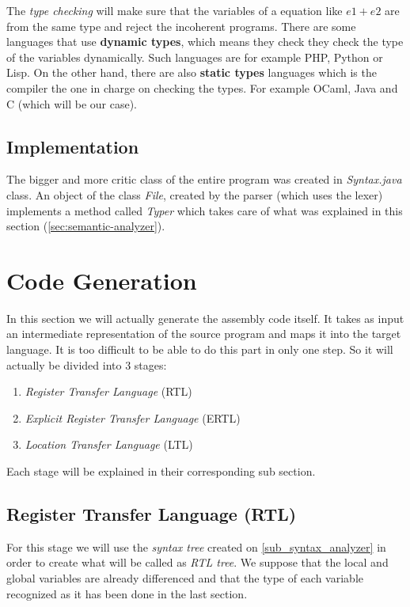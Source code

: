 \documentclass[conference]{IEEEtran}
\begin{document}
The \textit{type checking} will make sure that the variables of a equation like \(e1 + e2\) are from the same type and reject the incoherent programs. 
There are some languages that use \textbf{dynamic types}, which means they check they check the type of the variables dynamically. Such languages are for example PHP, Python or Lisp. On the other hand, there are also \textbf{static types} languages which is the compiler the one in charge on checking the types. For example OCaml, Java and C (which will be our case).

\subsection{Implementation}
The bigger and more critic class of the entire program was created in \textit{Syntax.java} class. An object of the class \textit{File}, created by the parser (which uses the lexer) implements a method called \textit{Typer} which takes care of what was explained in this section (\ref{sec:semantic-analyzer}).


\section{Code Generation}
In this section we will actually generate the assembly code itself. It takes as input an intermediate representation of the source program and maps it into the target language. 
It is too difficult to be able to do this part in only one step. So it will actually be divided into 3 stages:
\begin{enumerate}
	\item \textit{Register Transfer Language} (RTL)
	\item \textit{Explicit Register Transfer Language} (ERTL)
	\item \textit{Location Transfer Language} (LTL)
\end{enumerate}
Each stage will be explained in their corresponding sub section.

\subsection{Register Transfer Language (RTL)} \label{sec:RTL}
For this stage we will use the \textit{syntax tree} created on \ref{sub_syntax_analyzer} in order to create what will be called as \textit{RTL tree}. We suppose that the local and global variables are already differenced and that the type of each variable recognized as it has been done in the last section.
\end{document}
